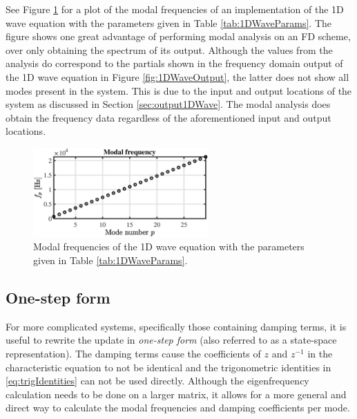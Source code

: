 {{See Figure \ref{fig:modalFreqs1Dwave} for a plot of the modal frequencies of an implementation of the 1D wave equation with the parameters given in Table \ref{tab:1DWaveParams}.
The figure shows one great advantage of performing modal analysis on an FD scheme, over only obtaining the spectrum of its output. Although the values from the analysis do correspond to the partials shown in the frequency domain output of the 1D wave equation in Figure \ref{fig:1DWaveOutput}, the latter does not show all modes present in the system. This is due to the input and output locations of the system as discussed in Section \ref{sec:output1DWave}. The modal analysis does obtain the frequency data regardless of the aforementioned input and output locations. 

\begin{figure}[h]
    \centering
    \includegraphics[width = 0.6\textwidth]{figures/analysis/1dmodes.eps}
    \caption{Modal frequencies of the 1D wave equation with the parameters given in Table \ref{tab:1DWaveParams}. \label{fig:modalFreqs1Dwave}}
\end{figure}

\subsection{One-step form}\label{sec:oneStepForm}
For more complicated systems, specifically those containing damping terms, it is useful to rewrite the update in \textit{one-step form} (also referred to as a state-space representation). The damping terms cause the coefficients of $z$ and $z^{-1}$ in the characteristic equation to not be identical and the trigonometric identities in \eqref{eq:trigIdentities} can not be used directly. Although the eigenfrequency calculation needs to be done on a larger matrix, it allows for a more general and direct way to calculate the modal frequencies and damping coefficients per mode. 

}}

